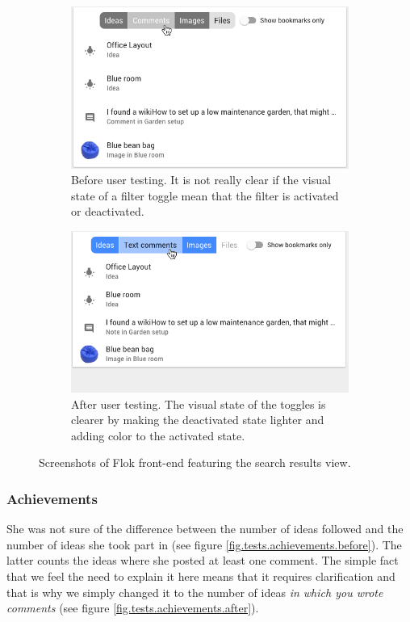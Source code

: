 \documentclass[a4paper,12pt, oneside]{article}
\begin{document}
\begin{figure}[!htb]
    \begin{subfigure}[t]{.495\textwidth}
        \includegraphics[width=\textwidth]{images/user_tests/search_before.png}
        \caption{Before user testing. It is not really clear if the visual state of a filter toggle mean that the filter is activated or deactivated.}
        \label{fig.tests.search.before}
    \end{subfigure}
    \hfill
    \begin{subfigure}[t]{.495\textwidth}
        \includegraphics[width=\textwidth]{images/user_tests/search_after.png}
        \caption{After user testing. The visual state of the toggles is clearer by making the deactivated state lighter and adding color to the activated state.}
        \label{fig.tests.search.after}
    \end{subfigure}
    \caption{Screenshots of Flok front-end featuring the search results view.}
    \label{fig.tests.search}
\end{figure}

\subsubsection*{Achievements}
She was not sure of the difference between the number of ideas followed and the number of ideas she took part in (see figure \ref{fig.tests.achievements.before}).
The latter counts the ideas where she posted at least one comment.
The simple fact that we feel the need to explain it here means that it requires clarification and that is why we simply changed it to the number of ideas \emph{in which you wrote comments} (see figure \ref{fig.tests.achievements.after}).
\end{document}
